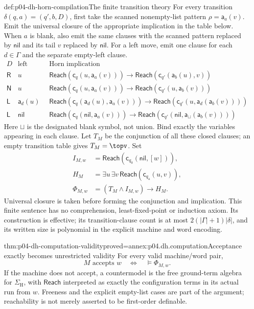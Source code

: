 \begin{hbmethod}{def:p04-dh-horn-compilation}{The finite transition theory}
For every transition \(\delta(q,a)=(q',b,D)\), first take the scanned
nonempty-list pattern \(\rho=\mathsf a_a(v)\). Emit the universal closure
of the appropriate implication in the table below. When \(a\) is blank,
also emit the same clauses with the scanned pattern replaced by
\(\mathsf{nil}\) and its tail \(v\) replaced by \(\mathsf{nil}\).
For a left move, emit one clause for each \(d\in\Gamma\) and the separate
empty-left clause.
\[
\begin{array}{c|c|l}
D&\text{left pattern}&\text{Horn implication}\\ \hline
\mathsf R&u&
 \mathsf{Reach}(\mathsf c_q(u,\mathsf a_a(v)))
 \to\mathsf{Reach}(\mathsf c_{q'}(\mathsf a_b(u),v))\\
\mathsf N&u&
 \mathsf{Reach}(\mathsf c_q(u,\mathsf a_a(v)))
 \to\mathsf{Reach}(\mathsf c_{q'}(u,\mathsf a_b(v)))\\
\mathsf L&\mathsf a_d(u)&
 \mathsf{Reach}(\mathsf c_q(\mathsf a_d(u),\mathsf a_a(v)))
 \to\mathsf{Reach}(\mathsf c_{q'}(u,\mathsf a_d(\mathsf a_b(v))))\\
\mathsf L&\mathsf{nil}&
 \mathsf{Reach}(\mathsf c_q(\mathsf{nil},\mathsf a_a(v)))
 \to\mathsf{Reach}(\mathsf c_{q'}(\mathsf{nil},
                 \mathsf a_{\sqcup}(\mathsf a_b(v))))
\end{array}
\]
Here \(\sqcup\) is the designated blank symbol, not union. Bind exactly
the variables appearing in each clause. Let \(T_M\) be the conjunction
of all these closed clauses; an empty transition table gives
\(T_M=\topv\). Set
\[
\begin{aligned}
 I_{M,w}&=\mathsf{Reach}(\mathsf c_{q_0}(\mathsf{nil},[w])),\\
 H_M&=\exists u\,\exists v\,
             \mathsf{Reach}(\mathsf c_{q_{\mathrm a}}(u,v)),\\
 \Phi_{M,w}&=(T_M\land I_{M,w})\to H_M.
\end{aligned}
\]
Universal closure is taken before forming the conjunction and implication.
This finite sentence has no comprehension, least-fixed-point or induction
axiom. Its construction is effective; its transition-clause count is
at most \(2(|\Gamma|+1)|\delta|\), and its written size is polynomial
in the explicit machine and word encoding.
\end{hbmethod}

\begin{hblemma}{thm:p04-dh-computation-validity}{proved=annex:p04.dh.computation}{Acceptance exactly becomes unrestricted validity}
For every valid machine/word pair,
\[
 M\text{ accepts }w\quad\Longleftrightarrow\quad
 \models\Phi_{M,w}.
\]
If the machine does not accept, a countermodel is the free ground-term
algebra for \(\Sigma_{\mathrm H}\), with \(\mathsf{Reach}\) interpreted
as exactly the configuration terms in its actual run from \(w\).
Freeness and the explicit empty-list cases are part of the argument;
reachability is not merely asserted to be first-order definable.
\end{hblemma}


